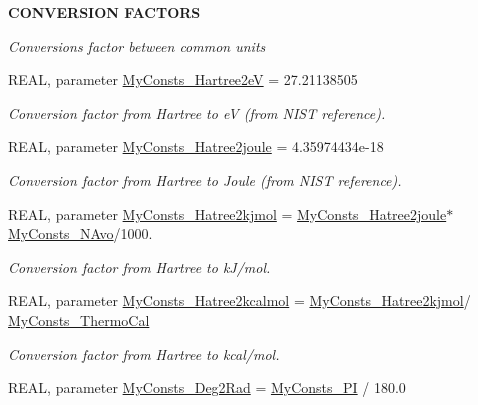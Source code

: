\begin{Indent}{\bf CONVERSION FACTORS}\par
{\em \label{_amgrp967a702e6e71caee351fcca5d9a7e303}
Conversions factor between common units }\begin{DoxyCompactItemize}
\item 
REAL, parameter \hyperlink{namespace_my_consts_aa924b16cd5b1a897d1d3983c45adca62}{MyConsts\_\-Hartree2eV} = 27.21138505
\begin{DoxyCompactList}\small\item\em Conversion factor from Hartree to eV (from NIST reference). \item\end{DoxyCompactList}\item 
REAL, parameter \hyperlink{namespace_my_consts_aaa4538847321d2d0c658c076868a98e6}{MyConsts\_\-Hatree2joule} = 4.35974434e-\/18
\begin{DoxyCompactList}\small\item\em Conversion factor from Hartree to Joule (from NIST reference). \item\end{DoxyCompactList}\item 
REAL, parameter \hyperlink{namespace_my_consts_a52c584174f4239e0fc306f998e2ea995}{MyConsts\_\-Hatree2kjmol} = \hyperlink{namespace_my_consts_aaa4538847321d2d0c658c076868a98e6}{MyConsts\_\-Hatree2joule}$\ast$\hyperlink{namespace_my_consts_a9d0cf18aaa762022e93aa97d649e6cbd}{MyConsts\_\-NAvo}/1000.
\begin{DoxyCompactList}\small\item\em Conversion factor from Hartree to kJ/mol. \item\end{DoxyCompactList}\item 
REAL, parameter \hyperlink{namespace_my_consts_a10bc4f3baa41b52bdf26dc261a49bcf7}{MyConsts\_\-Hatree2kcalmol} = \hyperlink{namespace_my_consts_a52c584174f4239e0fc306f998e2ea995}{MyConsts\_\-Hatree2kjmol}/ \hyperlink{namespace_my_consts_ac5ba183f9282fe2c8554f8b9f5c7d5d1}{MyConsts\_\-ThermoCal}
\begin{DoxyCompactList}\small\item\em Conversion factor from Hartree to kcal/mol. \item\end{DoxyCompactList}\item 
REAL, parameter \hyperlink{namespace_my_consts_ac63452d39765e7e679949322436dfb08}{MyConsts\_\-Deg2Rad} = \hyperlink{namespace_my_consts_a269bb97656a3220bb770f00b1a25bf4c}{MyConsts\_\-PI} / 180.0

\end{DoxyCompactItemize}
\end{Indent}
